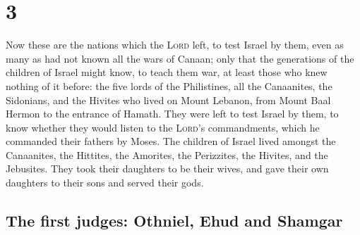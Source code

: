 \hypertarget{section-2}{%
\section{3}\label{section-2}}

 Now these are the nations which the \textsc{Lord} left,
to test Israel by them, even as many as had not known all the wars of
Canaan;  only that the generations of the children of
Israel might know, to teach them war, at least those who knew nothing of
it before:  the five lords of the Philistines, all the
Canaanites, the Sidonians, and the Hivites who lived on Mount Lebanon,
from Mount Baal Hermon to the entrance of Hamath.  They
were left to test Israel by them, to know whether they would listen to
the \textsc{Lord}'s commandments, which he commanded their fathers by
Moses.  The children of Israel lived amongst the
Canaanites, the Hittites, the Amorites, the Perizzites, the Hivites, and
the Jebusites.  They took their daughters to be their
wives, and gave their own daughters to their sons and served their gods.

\hypertarget{the-first-judges-othniel-ehud-and-shamgar}{%
\subsection{The first judges: Othniel, Ehud and
Shamgar}\label{the-first-judges-othniel-ehud-and-shamgar}}

